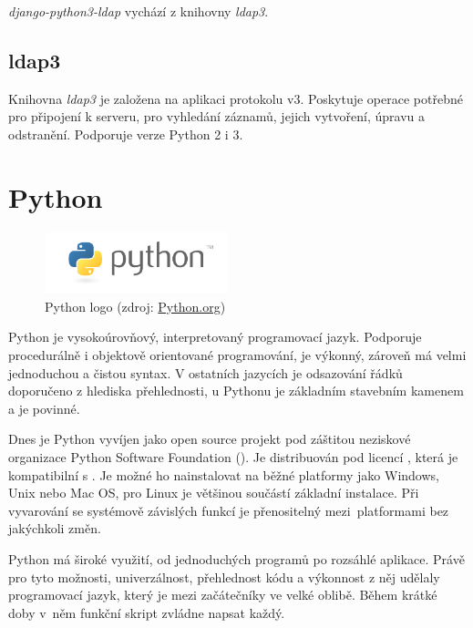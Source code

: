 \textit{django-python3-ldap} vychází z knihovny \textit{ldap3}.

\subsection{ldap3}
Knihovna \textit{ldap3} je založena na aplikaci protokolu 
v3. Poskytuje operace potřebné pro připojení k  serveru, pro
vyhledání záznamů, jejich vytvoření, úpravu a odstranění. Podporuje
verze Python 2 i 3.


\section{Python}

\begin{figure}[H] \centering
      \includegraphics[width=150pt]{./pictures/python-logo-master-v3-TM.png}
      \caption[Python logo]{Python logo (zdroj:
\href{https://www.python.org/static/community_logos/python-logo-master-v3-TM.png}{Python.org})}
      \label{fig:python}
  \end{figure}
  

Python je vysokoúrovňový, interpretovaný programovací jazyk. Podporuje
procedurálně i objektově orientované programování, je výkonný, zároveň
má velmi jednoduchou a čistou syntax. V ostatních jazycích je
odsazování řádků doporučeno z hlediska přehlednosti, u Pythonu je
základním stavebním kamenem a je povinné.\cite{Kulovana, 2017}

Dnes je Python vyvíjen jako open source projekt
pod záštitou neziskové organizace Python Software Foundation
(). Je distribuován pod licencí , která je
kompatibilní s . Je možné ho nainstalovat na běžné platformy
jako Windows, Unix nebo Mac OS, pro Linux je většinou součástí
základní instalace. Při vyvarování se systémově závislých funkcí je
přenositelný mezi~platformami bez jakýchkoli změn.

Python má široké využití, od jednoduchých programů po rozsáhlé
aplikace. Právě pro tyto možnosti, univerzálnost, přehlednost kódu a
výkonnost z něj udělaly programovací jazyk, který je mezi začátečníky ve
velké oblibě. Během krátké doby v~něm funkční skript zvládne napsat
každý.

